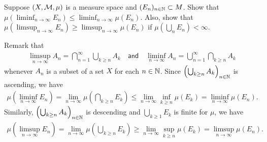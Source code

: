 \begin{prob}[Exercise 1.8]
    Suppose $(X, {\mathcal{M}}, \mu)$ is a measure space and $(E_n)_{n\in{\mathbb{N}}}\subset M$.
    Show that $\mu\left(\liminf_{n\rightarrow\infty}E_n\right)\leq\liminf_{n\rightarrow\infty}\mu(E_n)$.
    Also, show that $\mu\left(\limsup_{n\rightarrow\infty}E_n\right)\geq\limsup_{n\rightarrow\infty}\mu(E_n)$ if $\mu\left(\bigcup_n E_n\right)<\infty$.
\end{prob}
\begin{sol}
    Remark that
    \begin{align*}
        \limsup_{n\rightarrow\infty} A_n=\bigcap_{n=1}^\infty \bigcup_{k\geq n} A_k
        \quad\textsf{and}\quad
        \liminf_{n\rightarrow\infty} A_n=\bigcup_{n=1}^\infty \bigcap_{k\geq n} A_k
    \end{align*}
    whenever $A_n$ is a subset of a set $X$ for each $n\in{\mathbb{N}}$.
    Since $\left(\bigcup_{k\geq n} A_k\right)_{n\in{\mathbb{N}}}$ is ascending, we have
    \begin{align*}
        \mu\left(\liminf_{n\rightarrow\infty}E_n\right)=\lim_{n\rightarrow\infty}\mu\left(\bigcap_{k\geq n} E_k\right)\leq\lim_{n\rightarrow\infty}\inf_{k\geq n}\mu(E_k)=\liminf_{n\rightarrow\infty}\mu(E_n).
    \end{align*}
    Similarly, $\left(\bigcup_{k\geq n} A_k\right)_{n\in{\mathbb{N}}}$ is descending and $\bigcup_{k\geq 1} E_k$ is finite for $\mu$, we have
    \begin{align*}
        \mu\left(\limsup_{n\rightarrow\infty}E_n\right)=\lim_{n\rightarrow\infty}\mu\left(\bigcup_{k\geq n} E_k\right)\geq\lim_{n\rightarrow\infty}\sup_{k\geq n}\mu(E_k)=\limsup_{n\rightarrow\infty}\mu(E_n).
    \end{align*}
\end{sol}

